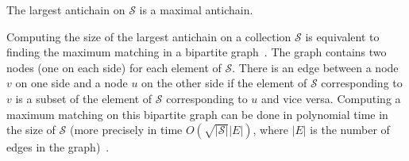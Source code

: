 \begin{fact}\label{fact:largestantichain}
	The largest antichain on $\mathcal{S}$ is a maximal antichain.
\end{fact}

Computing the size of the largest antichain on a collection $\mathcal{S}$ is
equivalent to finding the maximum matching in a bipartite graph~\citep{FordF62}.
The graph contains two nodes (one on each side) for each element of
$\mathcal{S}$. There is an edge between a node $v$ on one side and a node $u$ on
the other side if the element of $\mathcal{S}$ corresponding to $v$ is a subset
of the element of $\mathcal{S}$ corresponding to $u$ and vice versa. Computing a
maximum matching on this bipartite graph can be done in polynomial time in the
size of $\mathcal{S}$ (more precisely in time $O(\sqrt{|\mathcal{S}|}|E|)$,
where $|E|$ is the number of edges in the graph)~\citep{HopcroftK73}.

